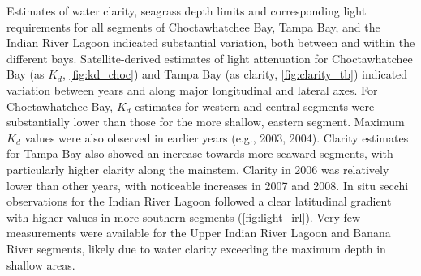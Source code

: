 \documentclass[letterpaper,12pt,oneside]{article}\usepackage[]{graphicx}\usepackage[]{color}
\begin{document}
Estimates of water clarity, seagrass depth limits and corresponding light requirements for all segments of Choctawhatchee Bay, Tampa Bay, and the Indian River Lagoon indicated substantial variation, both between and within the different bays.  Satellite-derived estimates of light attenuation for Choctawhatchee Bay (as $K_d$, \cref{fig:kd_choc}) and Tampa Bay (as clarity, \cref{fig:clarity_tb}) indicated variation between years and along major longitudinal and lateral axes.  For Choctawhatchee Bay, $K_d$ estimates for western and central segments were substantially lower than those for the more shallow, eastern segment.  Maximum $K_d$ values were also observed in earlier years (e.g., 2003, 2004).  Clarity estimates for Tampa Bay also showed an increase towards more seaward segments, with particularly higher clarity along the mainstem.  Clarity in 2006 was relatively lower than other years, with noticeable increases in 2007 and 2008.  In situ secchi observations for the Indian River Lagoon followed a clear latitudinal gradient with higher values in more southern segments (\cref{fig:light_irl}).  Very few measurements were available for the Upper Indian River Lagoon and Banana River segments, likely due to water clarity exceeding the maximum depth in shallow areas.
\end{document}
